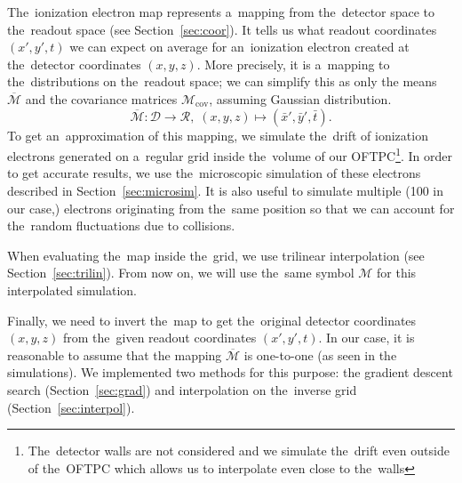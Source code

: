 		The~ionization electron map represents a~mapping from the~detector space to the~readout space (see Section~\ref{sec:coor}). It tells us what readout coordinates $(x',y',t)$ we can expect on average for an~ionization electron created at the~detector coordinates $(x,y,z)$. More precisely, it is a~mapping to the~distributions on the~readout space; we can simplify this as only the means $\overbar{\mathcal{M}}$ and the covariance matrices $\mathcal{M}_\text{cov}$, assuming Gaussian distribution.
			\begin{equation}
				\overbar{\mathcal{M}}: \mathcal{D} \longrightarrow \mathcal{R},\; (x,y,z) \longmapsto (\bar{x}',\bar{y}',\bar{t}).
			\end{equation}
		To get an~approximation of this mapping, we simulate the~drift of ionization electrons generated on a~regular grid inside the~volume of our \ac{OFTPC}\footnote{The~detector walls are not considered and we simulate the~drift even outside of the~\ac{OFTPC} which allows us to interpolate even close to the~walls}. In order to get accurate results, we use the~microscopic simulation of these electrons described in Section~\ref{sec:microsim}. It is also useful to simulate multiple (100 in our case,) electrons originating from the~same position so that we can account for the~random fluctuations due to collisions.
		
		When evaluating the~map inside the~grid, we use trilinear interpolation (see Section~\ref{sec:trilin}). From now on, we will use the~same symbol $\mathcal{M}$ for this interpolated simulation.
		
		Finally, we need to invert the~map to get the~original detector coordinates $(x,y,z)$ from the~given readout coordinates $(x',y',t)$. In our case, it is reasonable to assume that the mapping $\overbar{\mathcal{M}}$ is one-to-one (as seen in the simulations). We implemented two methods for this purpose: the gradient descent search (Section~\ref{sec:grad}) and interpolation on the~inverse grid (Section~\ref{sec:interpol}).
		
